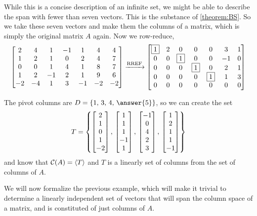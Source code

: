 \documentclass{ximera}
\begin{document}
\begin{example}
  While this is a concise description of an infinite set, we might be
  able to describe the span with fewer than seven vectors.  This is
  the substance of \ref{theorem:BS}.  So we take these seven vectors
  and make them the columns of a matrix, which is simply the original
  matrix $A$ again.  Now we row-reduce,
  \[
    \begin{bmatrix}
      2 & 4 & 1 & -1 & 1 & 4 & 4 \\
      1 & 2 & 1 & 0 & 2 & 4 & 7 \\
      0 & 0 & 1 & 4 & 1 & 8 & 7 \\
      1 & 2 & -1 & 2 & 1 & 9 & 6 \\
      -2 & -4 & 1 & 3 & -1 & -2 & -2
    \end{bmatrix}
    \xrightarrow{\text{RREF}}
    \begin{bmatrix}
      \fbox{1} & 2 & 0 & 0 & 0 & 3 & 1 \\
      0 & 0 & \fbox{1} & 0 & 0 & -1 & 0 \\
      0 & 0 & 0 & \fbox{1} & 0 & 2 & 1 \\
      0 & 0 & 0 & 0 & \fbox{1} & 1 & 3 \\
      0 & 0 & 0 & 0 & 0 & 0 & 0
    \end{bmatrix}
  \]
  
  The pivot columns are $D=\set{1,\,3,\,4,\,\answer{5}}$, so we can create the set
  \[
    T=\left\{
      \begin{bmatrix} 2 \\ 1 \\ 0 \\ 1 \\ -2 \end{bmatrix},\,
      \begin{bmatrix} 1 \\ 1 \\ 1 \\ -1 \\ 1 \end{bmatrix},\,
      \begin{bmatrix} -1 \\ 0 \\ 4 \\ 2 \\ 3 \end{bmatrix},\,
      \begin{bmatrix} 1 \\ 2 \\ 1 \\ 1 \\ -1 \end{bmatrix}
    \right\}
  \]
  and know that $\mathcal{C}\!\left(A\right)=\left\langle T\right\rangle$ and $T$ is a linearly
   set of
  columns from the set of columns of $A$.
\end{example}
  
We will now formalize the previous example, which will make it
trivial to determine a linearly independent set of vectors that will
span the column space of a matrix, and is constituted of just
columns of $A$.
\end{document}
